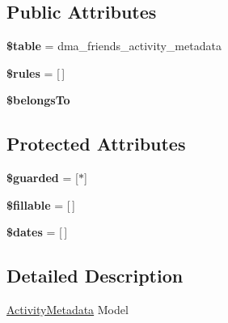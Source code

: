 \subsection*{Public Attributes}
\begin{DoxyCompactItemize}
\item 
\hypertarget{classDMA_1_1Friends_1_1Models_1_1ActivityMetadata_a9c8aa7ea6d9f45141918ce6b7a570bc3}{}{\bfseries \$table} = \textquotesingle{}dma\+\_\+friends\+\_\+activity\+\_\+metadata\textquotesingle{}\label{classDMA_1_1Friends_1_1Models_1_1ActivityMetadata_a9c8aa7ea6d9f45141918ce6b7a570bc3}

\item 
\hypertarget{classDMA_1_1Friends_1_1Models_1_1ActivityMetadata_a8038b90e92fe76cd7f7b86d32c8b01b8}{}{\bfseries \$rules} = \mbox{[}$\,$\mbox{]}\label{classDMA_1_1Friends_1_1Models_1_1ActivityMetadata_a8038b90e92fe76cd7f7b86d32c8b01b8}

\item 
{\bfseries \$belongs\+To}
\end{DoxyCompactItemize}
\subsection*{Protected Attributes}
\begin{DoxyCompactItemize}
\item 
\hypertarget{classDMA_1_1Friends_1_1Models_1_1ActivityMetadata_ae295fa39a4e26ba207f9c606a9348957}{}{\bfseries \$guarded} = \mbox{[}\textquotesingle{}$\ast$\textquotesingle{}\mbox{]}\label{classDMA_1_1Friends_1_1Models_1_1ActivityMetadata_ae295fa39a4e26ba207f9c606a9348957}

\item 
\hypertarget{classDMA_1_1Friends_1_1Models_1_1ActivityMetadata_a057b7754ecf2cacfa7be3fa003cae61e}{}{\bfseries \$fillable} = \mbox{[}$\,$\mbox{]}\label{classDMA_1_1Friends_1_1Models_1_1ActivityMetadata_a057b7754ecf2cacfa7be3fa003cae61e}

\item 
\hypertarget{classDMA_1_1Friends_1_1Models_1_1ActivityMetadata_a88007f604baf0815d66368f4dbdf88aa}{}{\bfseries \$dates} = \mbox{[}$\,$\mbox{]}\label{classDMA_1_1Friends_1_1Models_1_1ActivityMetadata_a88007f604baf0815d66368f4dbdf88aa}

\end{DoxyCompactItemize}


\subsection{Detailed Description}
\hyperlink{classDMA_1_1Friends_1_1Models_1_1ActivityMetadata}{Activity\+Metadata} Model 

